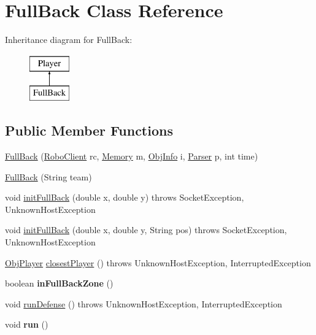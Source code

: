 \hypertarget{classFullBack}{
\section{FullBack Class Reference}
\label{classFullBack}
}
Inheritance diagram for FullBack:\begin{figure}[H]
\begin{center}
\leavevmode
\includegraphics[height=2.000000cm]{classFullBack}
\end{center}
\end{figure}
\subsection*{Public Member Functions}
\begin{DoxyCompactItemize}
\item 
\hyperlink{classFullBack_acbe24697aec4b8fdf44d3ec60a9fa40d}{FullBack} (\hyperlink{classRoboClient}{RoboClient} rc, \hyperlink{classMemory}{Memory} m, \hyperlink{classObjInfo}{ObjInfo} i, \hyperlink{classParser}{Parser} p, int time)
\item 
\hyperlink{classFullBack_a7918587f26bf13173e7065187e48e03c}{FullBack} (String team)
\item 
void \hyperlink{classFullBack_ac213422fc423c607d56d4b5710d0192e}{initFullBack} (double x, double y)  throws SocketException, UnknownHostException 
\item 
void \hyperlink{classFullBack_a4b2e2ea2db6684474a63e7c257b9c67a}{initFullBack} (double x, double y, String pos)  throws SocketException, UnknownHostException 
\item 
\hyperlink{classObjPlayer}{ObjPlayer} \hyperlink{classFullBack_afd24e3c5ff7c8b93c77069e9f86cd9ab}{closestPlayer} ()  throws UnknownHostException, InterruptedException 
\item 
\hypertarget{classFullBack_a3638f5f61bca69dc81571c1dcbfa46e7}{
boolean {\bfseries inFullBackZone} ()}
\label{classFullBack_a3638f5f61bca69dc81571c1dcbfa46e7}

\item 
void \hyperlink{classFullBack_ab02ecfe8c92fdb837ed6bf6c7389cfc0}{runDefense} ()  throws UnknownHostException, InterruptedException 
\item 
\hypertarget{classFullBack_aef6e79bcb91ec2baebd71a601cfe94fc}{
void {\bfseries run} ()}
\label{classFullBack_aef6e79bcb91ec2baebd71a601cfe94fc}

\end{DoxyCompactItemize}



